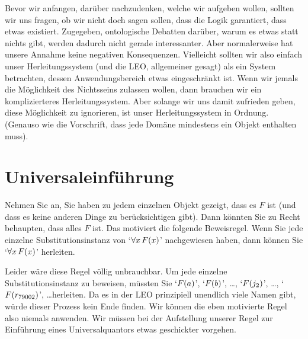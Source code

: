 Bevor wir anfangen, darüber nachzudenken, welche wir aufgeben wollen, sollten wir uns fragen, ob wir nicht doch sagen sollen, dass die Logik garantiert, dass etwas existiert. Zugegeben, ontologische Debatten darüber, warum es etwas statt nichts gibt, werden dadurch nicht gerade interessanter. Aber normalerweise hat unsere Annahme keine negativen Konsequenzen. Vielleicht sollten wir also einfach unser Herleitungssystem (und die LEO, allgemeiner gesagt) als ein System betrachten, dessen Anwendungsbereich etwas eingeschränkt ist. Wenn wir jemals die Möglichkeit des Nichtsseins zulassen wollen, dann brauchen wir ein komplizierteres Herleitungssystem. Aber solange wir uns damit zufrieden geben, diese Möglichkeit zu ignorieren, ist unser Herleitungssystem in Ordnung. (Genauso wie die Vorschrift, dass jede Domäne mindestens ein Objekt enthalten muss).

\section{Universaleinführung}
Nehmen Sie an, Sie haben zu jedem einzelnen Objekt gezeigt, dass es $F$ ist (und dass es keine anderen Dinge zu berücksichtigen gibt). Dann könnten Sie zu Recht behaupten, dass alles $F$ ist. Das motiviert die folgende Beweisregel. Wenn Sie jede einzelne Substitutionsinstanz von `$\forall x\, \mathord{F}(x)$' nachgewiesen haben, dann können Sie `$\forall x\, \mathord{F}(x)$' herleiten. 

Leider wäre diese Regel völlig unbrauchbar. Um jede einzelne Substitutionsinstanz zu beweisen, müssten Sie `$\mathord{F}(a)$', `$\mathord{F}(b)$', \dots, `$\mathord{F}(j_2)$', \dots, `$\mathord{F}(r_{79002})$', \dots herleiten. Da es in der LEO prinzipiell unendlich viele Namen gibt, würde dieser Prozess kein Ende finden. Wir können die eben motivierte Regel also niemals anwenden. Wir müssen bei der Aufstellung unserer Regel zur Einführung eines Universalquantors etwas geschickter vorgehen. 

